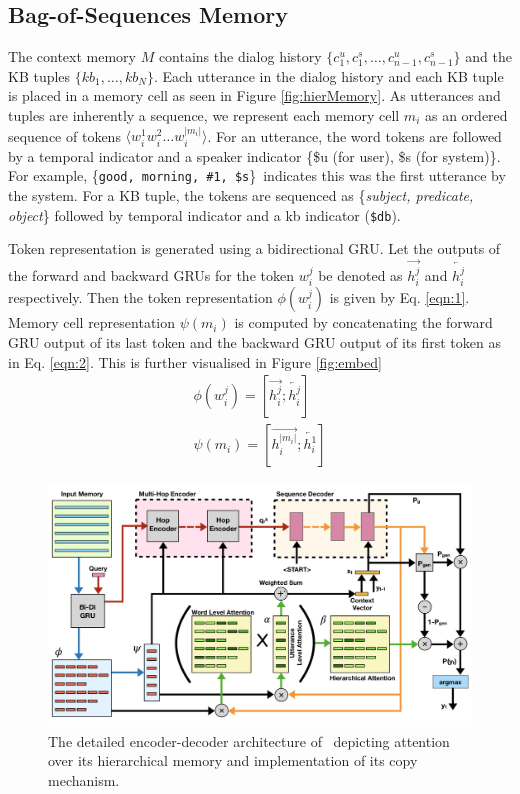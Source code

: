 \subsection{Bag-of-Sequences Memory} 
\label{sec:hmemory}
The context memory $M$ contains the dialog history $\{c_1^u, c_1^s, \ldots, c_{n-1}^u, c_{n-1}^s\}$ and the KB tuples $\{kb_1, \ldots, kb_{N}\}$. Each utterance in the dialog history and each KB tuple is placed in a memory cell as seen in Figure \ref{fig:hierMemory}. As utterances and tuples are inherently a sequence, we represent each memory cell $m_i$ as an ordered sequence of tokens $\langle w^1_i w^2_i \ldots w^{|m_i|}_i\rangle$. For an utterance, the word tokens are followed by a temporal indicator and a speaker indicator \{\$u (for user), \$s (for system)\}. For example, \{\texttt{good, morning, \#1, \$s}\}\ indicates this was the first utterance by the system. For a KB tuple, the tokens are sequenced as \{\textit{subject, predicate, object}\} followed by temporal indicator and a kb indicator (\texttt{\$db}).

Token representation is generated using a bidirectional GRU. Let the outputs of the forward and backward GRUs for the token $w^j_i$ be denoted as $\overrightarrow{h^j_{i}}$ and $\overleftarrow{h^j_{i}}$ respectively. Then the token representation $\phi(w^j_i)$ is given by Eq. \ref{eqn:1}. Memory cell representation $\psi(m_i)$ is computed by concatenating the forward GRU output of its last token and the backward GRU output of its first token as in Eq. \ref{eqn:2}. This is further visualised in Figure \ref{fig:embed}
\begin{eqnarray}
\phi(w^j_i)=[\overrightarrow{h^j_{i}};\overleftarrow{h_{i}^j}] \label{eqn:1} \\
\psi(m_i)=[\overrightarrow{h_{i}^{|m_i|}};\overleftarrow{h_{i}^1}] \label{eqn:2}
\end{eqnarray}

\begin{figure}[t]
\centering
\includegraphics[scale=0.4]{assets/paper_arch.png}
\caption{The detailed encoder-decoder architecture of \sys\ depicting attention over its hierarchical memory and implementation of its copy mechanism.}
\label{fig:fullsystem}
\end{figure}

